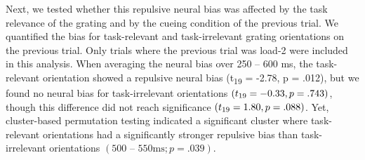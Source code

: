 \documentclass{article}
\begin{document}
Next, we tested whether this repulsive neural bias was affected by the task relevance of the grating and by the cueing condition of the previous trial. We quantified the bias for task-relevant and task-irrelevant grating orientations on the previous trial. Only trials where the previous trial was load-2 were included in this analysis. When averaging the neural bias over 250 – 600 ms, the task-relevant orientation showed a repulsive neural bias (t\textsubscript{19} = -2.78, p = .012), but we found no neural bias for task-irrelevant orientations $(t\textsubscript{19} = -0.33, p = .743)$, though this difference did not reach significance $(t\textsubscript{19} = 1.80, p = .088)$. Yet, cluster-based permutation testing indicated a significant cluster where task-relevant orientations had a significantly stronger repulsive bias than task-irrelevant orientations $(500 \text{ – } 550 \text{ms}; p = .039)$. \\
\end{document}
